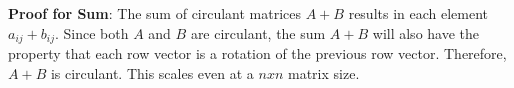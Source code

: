 \documentclass[8pt]{article}
\begin{document}





\textbf{Proof for Sum}:
 The sum of circulant matrices \( A + B \) results in each element \( a_{ij} + b_{ij} \). Since both \( A \) and \( B \) are circulant, the sum \( A + B \) will also have the property that each row vector is a rotation of the previous row vector. Therefore, \( A + B \) is circulant. This scales even at a $nxn$ matrix size.
\end{document}
